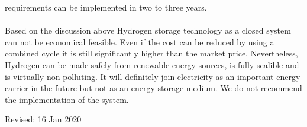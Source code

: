 \begin{parcolumns}[colwidths={1=2.5 cm, 2=10 cm, 3=2.5cm}]{3}
{requirements can be implemented in two to three years. \\ \\
\noindent
Based on the discussion above Hydrogen storage technology as a closed system can not be economical feasible. Even if the cost can be reduced by using a combined cycle it is still significantly higher than the market price. Nevertheless, Hydrogen can be made safely from renewable energy sources, is fully scalible and is virtually non-polluting. It will definitely join electricity as an important energy carrier in the future but not as an energy storage medium. We do not recommend the implementation of the system. 
}


\end{parcolumns}
\begin{flushright}
Revised: 16 Jan 2020
\end{flushright}
\clearpage
\cfoot{}
